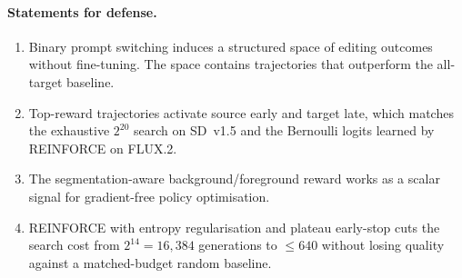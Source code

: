 \paragraph{Statements for defense.}
\begin{enumerate}
    \item Binary prompt switching induces a structured space of editing outcomes without fine-tuning. The space contains trajectories that outperform the all-target baseline.
    \item Top-reward trajectories activate source early and target late, which matches the exhaustive $2^{20}$ search on SD~v1.5 and the Bernoulli logits learned by REINFORCE on FLUX.2.
    \item The segmentation-aware background/foreground reward works as a scalar signal for gradient-free policy optimisation.
    \item REINFORCE with entropy regularisation and plateau early-stop cuts the search cost from $2^{14}=16{,}384$ generations to $\le 640$ without losing quality against a matched-budget random baseline.
\end{enumerate}
